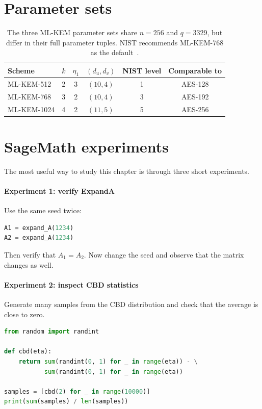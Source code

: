 \section{Parameter sets}
\begin{table}[H]
\centering
\begin{tabular}{lccccc}
\toprule
Scheme & $k$ & $\eta_1$ & $(d_u,d_v)$ & NIST level & Comparable to \\
\midrule
ML-KEM-512  & 2 & 3 & $(10,4)$ & 1 & AES-128 \\
ML-KEM-768  & 3 & 2 & $(10,4)$ & 3 & AES-192 \\
ML-KEM-1024 & 4 & 2 & $(11,5)$ & 5 & AES-256 \\
\bottomrule
\end{tabular}
\caption{The three ML-KEM parameter sets share $n=256$ and $q=3329$, but differ in their full parameter tuples. NIST recommends ML-KEM-768 as the default~\cite{nistir8547}.}
\label{tab:mlkem-params}
\end{table}

\section{SageMath experiments}

The most useful way to study this chapter is through three short experiments.

\paragraph{Experiment 1: verify ExpandA}

Use the same seed twice:

\begin{lstlisting}[language=Python]
A1 = expand_A(1234)
A2 = expand_A(1234)
\end{lstlisting}

Then verify that \(A_1 = A_2\). Now change the seed and observe that the matrix changes as well.

\paragraph{Experiment 2: inspect CBD statistics}

Generate many samples from the CBD distribution and check that the average is close to zero.

\begin{lstlisting}[language=Python]
from random import randint

def cbd(eta):
    return sum(randint(0, 1) for _ in range(eta)) - \
           sum(randint(0, 1) for _ in range(eta))

samples = [cbd(2) for _ in range(10000)]
print(sum(samples) / len(samples))
\end{lstlisting}

